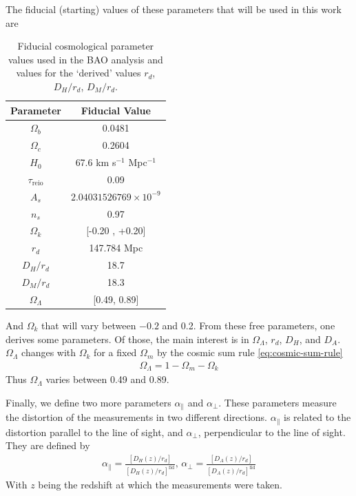 The fiducial (starting) values of these parameters that will be used in this work are
\begin{table}[t]
\begin{center}
\begin{tabular}{|c|c|}
\hline
Parameter & Fiducial Value \\
\hline
$\Omega_b$ & 0.0481 \\
$\Omega_c$ & 0.2604 \\
$H_0$ & 67.6 km s$^{-1}$ Mpc$^{-1}$ \\
$\tau_{\text{reio}}$ & 0.09 \\
$A_s$ & $2.04031526769 \times 10^{-9}$ \\
$n_s$ & 0.97 \\
$\Omega_k$ & [-0.20 , +0.20]  \\
\hline
\hline
$r_d$ & 147.784 Mpc \\
$D_H/r_d$ & 18.7 \\
$D_M/r_d$ & 18.3 \\
$\Omega_\Lambda$ & [0.49, 0.89] \\
\hline
\end{tabular}
\end{center}
\caption{Fiducial cosmological parameter values used in the BAO analysis and values for the `derived' values $r_d$, $D_H / r_d$, $D_M /r_d$.}
\label{tab:fid-values}
\end{table}
And $\Omega _k$ that will vary between $-0.2$ and 0.2. From these free parameters, one derives some parameters. Of those, the main interest is in $\Omega_\Lambda$, $r_d$, $D_H$, and $D_A$. $\Omega_\Lambda$ changes with $\Omega_k$ for a fixed $\Omega_m$ by the cosmic sum rule \eqref{eq:cosmic-sum-rule}
\begin{align}
	\Omega_\Lambda =  1 - \Omega_m - \Omega_k
\end{align}
Thus $\Omega_\Lambda$ varies between 0.49 and 0.89.

Finally, we define two more parameters $\alpha_\parallel$ and $\alpha_\perp$. These parameters measure the distortion of the measurements in two different directions. $\alpha_\parallel$ is related to the distortion parallel to the line of sight, and  $\alpha_\perp$, perpendicular to the line of sight. They are defined by 
\begin{align}
	\alpha_\parallel = \frac{\left[ D_H(z) /r_d \right] }{\left[ D_H(z)/r_d \right]^{\text{fid}} }, \, \alpha_\perp = \frac{\left[ D_A(z) /r_d \right] }{\left[ D_A(z)/r_d \right]^{\text{fid}} }
	\label{eq:alphas-def}
\end{align}
With $z$ being the redshift at which the measurements were taken.

